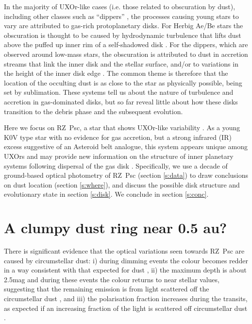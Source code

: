 \documentclass[useAMS,usenatbib,usegraphicx]{mn2e}
\begin{document}
In the majority of UXOr-like cases (i.e. those related to obscuration by dust), including
other classes such as ``dippers''
\citep[e.g.][]{2014AJ....147...82C,2016ApJ...816...69A}, the processes causing young
stars to vary are attributed to gas-rich protoplanetary disks. For Herbig Ae/Be stars the
obscuration is thought to be caused by hydrodynamic turbulence that lifts dust above the
puffed up inner rim of a self-shadowed disk \citep{2003ApJ...594L..47D}. For the dippers,
which are observed around low-mass stars, the obscuration is attributed to dust in
accretion streams that link the inner disk and the stellar surface, and/or to variations
in the height of the inner disk edge
\citep{1999A&A...349..619B,2016ApJ...816...69A,2016arXiv160503985B}. The common theme is
therefore that the location of the occulting dust is as close to the star as physically
possible, being set by sublimation. These systems tell us about the nature of turbulence
and accretion in gas-dominated disks, but so far reveal little about how these disks
transition to the debris phase and the subsequent evolution.

Here we focus on RZ~Psc, a star that shows UXOr-like variability
\citep[e.g.][]{1985PZ.....22..181Z,1999A&AS..140..293G,2003ARep...47..580S}. As a young
K0V type star with no evidence for gas accretion, but a strong infrared (IR) excess
suggestive of an Asteroid belt analogue, this system appears unique among UXOrs and may
provide new information on the structure of inner planetary systems following dispersal
of the gas disk \citep{2010A&A...524A...8G,2013A&A...553L...1D}. Specifically, we use a
decade of ground-based optical photometry of RZ~Psc (section \ref{s:data}) to draw
conclusions on dust location (section \ref{s:where}), and discuss the possible disk
structure and evolutionary state in section \ref{s:disk}. We conclude in section
\ref{s:conc}.

\section{A clumpy dust ring near 0.5 au?}\label{s:rzpscintro}

There is significant evidence that the optical variations seen towards RZ~Psc are caused
by circumstellar dust: i) during dimming events the colour becomes redder
\citep{1985PZ.....22..181Z,1980PZ.....21..310K} in a way consistent with that expected
for dust \citep{1981Afz....17...87P,2004ARep...48..470P}, ii) the maximum depth is about
2.5mag and during these events the colour returns to near stellar values, suggesting that
the remaining emission is from light scattered off the circumstellar dust \citep[i.e. the
star is fully occulted,][]{1981Afz....17...87P,1988SvAL...14...27G}, and iii) the
polarisation fraction increases during the transits, as expected if an increasing
fraction of the light is scattered off circumstellar dust
\citep{1988SvAL...14...27G,1991Afz....34..333K,2003ARep...47..580S}.
\end{document}
